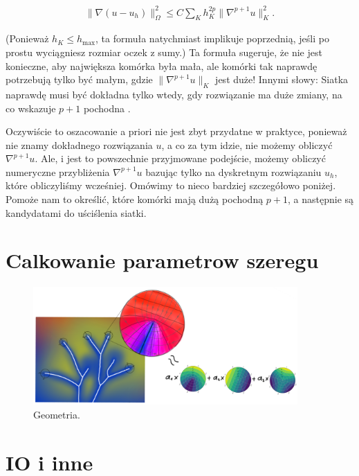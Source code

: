\documentclass[]{pracamgr}
\begin{document}
        \begin{align*}
          \|\nabla(u-u_h)\|_{\Omega}^2 \le C \sum_K h_K^{2p} \| \nabla^{p+1} u \|^2_K.
        \end{align*}

        (Ponieważ $h_K\le h_\text{max}$, ta formuła natychmiast implikuje poprzednią, jeśli po prostu wyciągniesz rozmiar oczek z sumy.) Ta formuła sugeruje, że nie jest konieczne, aby największa komórka była mała, ale komórki tak naprawdę potrzebują tylko być małym, gdzie $\| \nabla^{p+1} u \|_K$ jest duże! Innymi słowy: Siatka naprawdę musi być dokładna tylko wtedy, gdy rozwiązanie ma duże zmiany, na co wskazuje $p+1$ pochodna .
        
        Oczywiście to oszacowanie a priori nie jest zbyt przydatne w praktyce, ponieważ nie znamy dokładnego rozwiązania $u$, a co za tym idzie, nie możemy obliczyć $\nabla^{p+1}u$. Ale, i jest to powszechnie przyjmowane podejście, możemy obliczyć numeryczne przybliżenia $\nabla^{p+1}u$ bazując tylko na dyskretnym rozwiązaniu $u_h$, które obliczyliśmy wcześniej. Omówimy to nieco bardziej szczegółowo poniżej. Pomoże nam to określić, które komórki mają dużą pochodną $p+1$, a następnie są kandydatami do uściślenia siatki.

    \section{Calkowanie parametrow szeregu}
      
      \begin{figure}[H]
        \centering
        \includegraphics[width=0.9\textwidth]{figs/series_params_integration.png}        
        \caption {Geometria.}
        \label{series_params_integration}
      \end{figure}

    \section{IO i inne}
\end{document}

